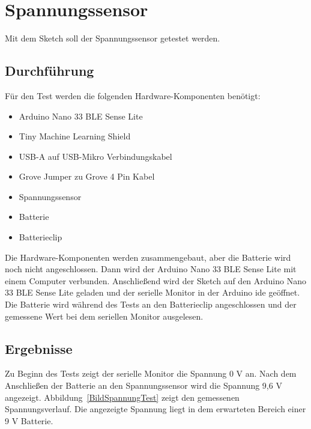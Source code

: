 \section{Spannungssensor}
Mit dem Sketch  soll der Spannungssensor getestet werden.

\begin{code}[h]
\end{code}

\subsection{Durchführung}

Für den Test werden die folgenden Hardware-Komponenten benötigt:

\begin{itemize}
    \item Arduino Nano 33 BLE Sense Lite
    \item Tiny Machine Learning Shield
    \item USB-A auf USB-Mikro Verbindungskabel
    \item Grove Jumper zu Grove 4 Pin Kabel
    \item Spannungssensor
    \item Batterie
    \item Batterieclip
\end{itemize}

Die Hardware-Komponenten werden  zusammengebaut, aber die Batterie wird noch nicht angeschlossen. Dann wird der Arduino Nano 33 BLE Sense Lite mit einem Computer verbunden. Anschließend wird der Sketch  auf den Arduino Nano 33 BLE Sense Lite geladen und der serielle Monitor in der Arduino \acs{ide} geöffnet. Die Batterie wird während des Tests an den Batterieclip angeschlossen und der gemessene Wert bei dem seriellen Monitor ausgelesen.

\subsection{Ergebnisse}

Zu Beginn des Tests zeigt der serielle Monitor die Spannung 0 V an. Nach dem Anschließen der Batterie an den Spannungssensor wird die Spannung 9,6 V angezeigt.  Abbildung~\ref{BildSpannungTest} zeigt den gemessenen Spannungsverlauf. Die angezeigte Spannung liegt in dem erwarteten Bereich einer 9 V Batterie.


